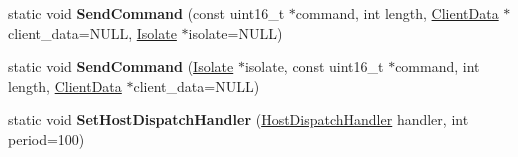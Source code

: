 \begin{DoxyCompactItemize}
\item 
\hypertarget{classv8_1_1_debug_a3fe024335cf785f8df1f072a9aea3555}{}static void {\bfseries Send\+Command} (const uint16\+\_\+t $\ast$command, int length, \hyperlink{classv8_1_1_debug_1_1_client_data}{Client\+Data} $\ast$client\+\_\+data=N\+U\+L\+L, \hyperlink{classv8_1_1_isolate}{Isolate} $\ast$isolate=N\+U\+L\+L)\label{classv8_1_1_debug_a3fe024335cf785f8df1f072a9aea3555}

\item 
\hypertarget{classv8_1_1_debug_aba2426f25ee7cd31659426287777bb00}{}static void {\bfseries Send\+Command} (\hyperlink{classv8_1_1_isolate}{Isolate} $\ast$isolate, const uint16\+\_\+t $\ast$command, int length, \hyperlink{classv8_1_1_debug_1_1_client_data}{Client\+Data} $\ast$client\+\_\+data=N\+U\+L\+L)\label{classv8_1_1_debug_aba2426f25ee7cd31659426287777bb00}

\item 
\hypertarget{classv8_1_1_debug_aa55c29d5cc7b04c4fc24cd89c77f3f54}{}static void {\bfseries Set\+Host\+Dispatch\+Handler} (\hyperlink{classv8_1_1_debug_a442f686afe7d80928b57b3ff8ac3f6e7}{Host\+Dispatch\+Handler} handler, int period=100)\label{classv8_1_1_debug_aa55c29d5cc7b04c4fc24cd89c77f3f54}


\end{DoxyCompactItemize}
